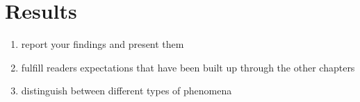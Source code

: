 
\section{Results}
\label{sec:res}

\begin{enumerate}
    \item report your findings and present them
    \item fulfill readers expectations that have been built up through the other chapters
    \item distinguish between different types of phenomena
\end{enumerate}